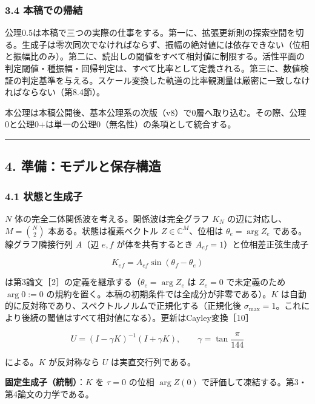 \documentclass[
  a4paper,
]{ltjsarticle}
\begin{document}
\subsubsection{3.4
本稿での帰結}\label{ux672cux7a3fux3067ux306eux5e30ux7d50}

公理0.5は本稿で三つの実際の仕事をする。第一に、拡張更新則の探索空間を切る。生成子は零次同次でなければならず、振幅の絶対値には依存できない（位相と振幅比のみ）。第二に、読出しの閾値をすべて相対値に制限する。活性平面の判定閾値・種振幅・回帰判定は、すべて比率として定義される。第三に、数値検証の判定基準を与える。スケール変換した軌道の比率観測量は厳密に一致しなければならない（第8.4節）。

本公理は本稿公開後、基本公理系の次版（v8）で0層へ取り込む。その際、公理0と公理0+は単一の公理0（無名性）の条項として統合する。

\begin{center}\rule{0.5\linewidth}{0.5pt}\end{center}

\subsection{4.
準備：モデルと保存構造}\label{ux6e96ux5099ux30e2ux30c7ux30ebux3068ux4fddux5b58ux69cbux9020}

\subsubsection{4.1
状態と生成子}\label{ux72b6ux614bux3068ux751fux6210ux5b50}

\(N\) 体の完全二体関係波を考える。関係波は完全グラフ \(K_N\)
の辺に対応し、\(M=\binom N2\) 本ある。状態は複素ベクトル
\(Z\in\mathbb C^M\)、位相は \(\theta_e=\arg Z_e\)
である。線グラフ隣接行列 \(A\)（辺 \(e,f\) が体を共有するとき
\(A_{ef}=1\)）と位相差正弦生成子

\[
K_{ef}=A_{ef}\sin(\theta_f-\theta_e)
\]

は第3論文［2］の定義を継承する（\(\theta_e=\arg Z_e\) は \(Z_e=0\)
で未定義のため \(\arg 0:=0\)
の規約を置く。本稿の初期条件では全成分が非零である）。\(K\)
は自動的に反対称であり、スペクトルノルムで正規化する（正規化後
\(\sigma_{\max}=1\)。これにより後続の閾値はすべて相対値になる）。更新はCayley変換［10］

\[
U=(I-\gamma K)^{-1}(I+\gamma K),
\qquad
\gamma=\tan\frac{\pi}{144}
\]

による。\(K\) が反対称なら \(U\) は実直交行列である。

\textbf{固定生成子（統制）}：\(K\) を \(\tau=0\) の位相 \(\arg Z(0)\)
で評価して凍結する。第3・第4論文の力学である。
\end{document}
